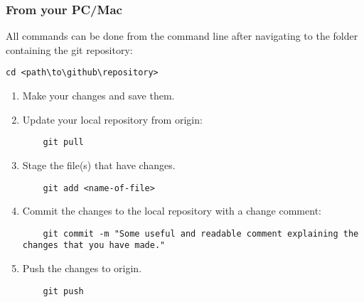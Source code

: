 \documentclass{article}
\begin{document}
\subsubsection{From your PC/Mac}
All commands can be done from the command line after navigating to the folder containing the git repository:
\begin{verbatim}
cd <path\to\github\repository>
\end{verbatim}

\begin{enumerate}
    \item Make your changes and save them.
    \item Update your local repository from origin:
	\begin{verbatim}
    git pull   
    \end{verbatim}
	\item Stage the file(s) that have changes.
	\begin{verbatim}
    git add <name-of-file>
    \end{verbatim}
	\item Commit the changes to the local repository with a change comment:
	\begin{verbatim}
    git commit -m "Some useful and readable comment explaining the changes that you have made."
    \end{verbatim}
	\item Push the changes to origin.
	\begin{verbatim}
    git push
    \end{verbatim}
\end{enumerate}
\end{document}
